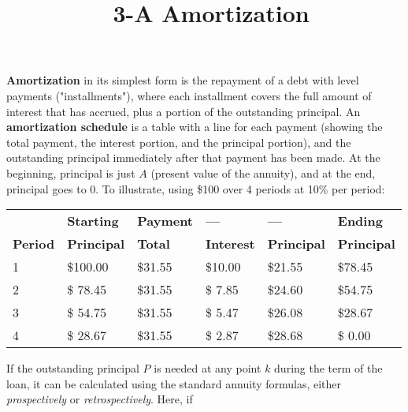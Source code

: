 \documentclass[12pt]{article}
\title{\normalfont\ 3-A Amortization} %
\author{} %
\date{}  %
\begin{document}

\maketitle %
\vspace{-1.3in}

\begin{flushleft}
    \textbf{Amortization} in its simplest form is the repayment of a debt with level payments ("installments"),
    where each installment covers the full amount of interest that has accrued, plus a portion of the outstanding
    principal.  An \textbf{amortization schedule} is a table with a line for each payment (showing the
    total payment, the interest portion, and the principal portion), and the outstanding principal immediately after
    that payment has been made.  At the beginning, principal is just $ A $ (present value of the annuity), and at
    the end, principal goes to 0.  To illustrate, using \$100 over 4 periods at 10\% per period:
\end{flushleft}

\begin{tabular}{@{ } l l  l  l l l @{ }}    %
    \toprule
    {\bfseries       }&{\bfseries Starting }&{\bfseries Payment}&{\bfseries ---}&{\bfseries ---}&{\bfseries Ending} \\
    {\bfseries Period}&{\bfseries Principal}&{\bfseries Total}&{\bfseries Interest}&{\bfseries Principal}&{\bfseries Principal} \\
    \cmidrule(lr){1-6}
    1 & \$100.00  & \$31.55 &\$10.00 &\$21.55 &\$78.45 \\
    2 & \$ 78.45  & \$31.55 &\$ 7.85 &\$24.60 &\$54.75 \\
    3 & \$ 54.75  & \$31.55 &\$ 5.47 &\$26.08 &\$28.67 \\
    4 & \$ 28.67  & \$31.55 &\$ 2.87 &\$28.68 &\$ 0.00 \\
    \bottomrule
\end{tabular}

\begin{flushleft}
    If the outstanding principal $ P $ is needed at any point $ k $ during the term of
    the loan, it can be calculated using the standard annuity formulas, either \textit{prospectively} or
    \textit{retrospectively}.  Here, if
\end{flushleft}
\end{document}
